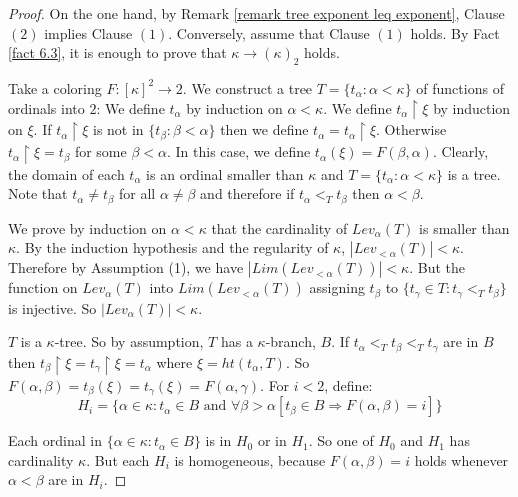 \documentclass[11pt]{amsart}
\theoremstyle{plain}
\theoremstyle{definition} %
\theoremstyle{remark}
\begin{document}
\begin{proof}
On the one hand, by Remark \ref{remark tree exponent leq exponent}, Clause $(2)$ implies Clause $(1)$. Conversely, assume that Clause $(1)$ holds. By Fact \ref{fact 6.3}, it is enough to prove that $\kappa \rightarrow (\kappa)_2$ holds.%

Take a coloring $F:[\kappa]^2 \to 2$. We construct a tree $T=\{t_\alpha:\alpha<\kappa\}$ of functions of ordinals into $2$: We define $t_\alpha$ by induction on $\alpha<\kappa$. We define $t_\alpha \restriction \xi$ by induction on $\xi$. If $t_\alpha \restriction \xi$ is not in $\{t_\beta:\beta<\alpha \}$ then we define $t_\alpha=t_\alpha \restriction \xi$. Otherwise $t_\alpha \restriction \xi=t_\beta$ for some $\beta<\alpha$. In this case, we define $t_\alpha(\xi)=F(\beta,\alpha)$. Clearly, the domain of each $t_\alpha$ is an ordinal smaller than $\kappa$ and $T=\{t_\alpha:\alpha<\kappa\}$ is a tree. Note that $t_\alpha \neq t_\beta$ for all $\alpha \neq \beta$ and therefore if $t_\alpha<_T t_\beta$ then $\alpha<\beta$.

We prove by induction on $\alpha<\kappa$ that the cardinality of $Lev_\alpha(T)$ is smaller than $\kappa$. By the induction hypothesis and the regularity of $\kappa$, $|Lev_{<\alpha}(T)|<\kappa$. Therefore by Assumption (1), we have $|Lim(Lev_{<\alpha}(T))|<\kappa$. But the function on $Lev_\alpha(T)$ into $Lim(Lev_{<\alpha}(T))$ assigning $t_\beta$ to $\{t_\gamma \in T:t_\gamma <_T t_\beta\}$ is injective. So $|Lev_\alpha(T)|<\kappa$.

$T$ is a $\kappa$-tree. So by assumption, $T$ has a $\kappa$-branch, $B$. If $t_\alpha<_T t_\beta<_T t_\gamma$ are in $B$ then $t_\beta \restriction \xi=t_\gamma \restriction \xi=t_\alpha$ where $\xi=ht(t_\alpha,T)$. So $F(\alpha,\beta)=t_\beta(\xi)=t_\gamma(\xi)=F(\alpha,\gamma)$. For $i<2$, define:
\[
H_i=\{\alpha \in \kappa:t_\alpha \in B \text{ and }\forall \beta>\alpha [t_\beta \in B \Rightarrow F(\alpha,\beta)=i]\}
\]

Each ordinal in $\{\alpha \in \kappa:t_\alpha \in B\}$ is in $H_0$ or in $H_1$. So one of $H_0$ and $H_1$ has cardinality $\kappa$. But each $H_i$ is homogeneous, because $F({\alpha,\beta})=i$ holds whenever $\alpha<\beta$ are in $H_i$.
\end{proof}
\end{document}
